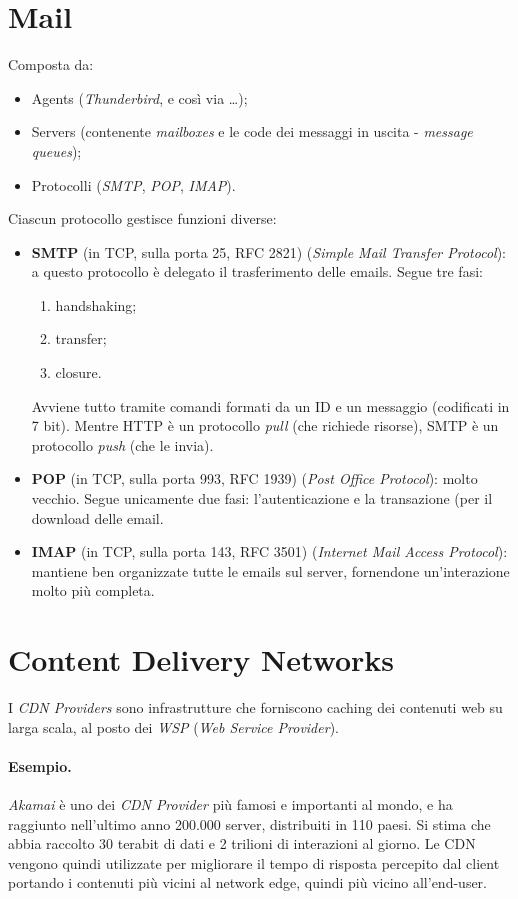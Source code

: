 \newpage

\section{Mail}
Composta da:
\begin{itemize}
    \item Agents (\textit{Thunderbird}, e così via \ldots);
    \item Servers (contenente \textit{mailboxes} e le code dei messaggi in uscita - \textit{message queues});
    \item Protocolli (\textit{SMTP}, \textit{POP}, \textit{IMAP}).
\end{itemize}
Ciascun protocollo gestisce funzioni diverse:
\begin{itemize}
    \item \textbf{SMTP} (in TCP, sulla porta 25, RFC 2821) (\textit{Simple Mail Transfer Protocol}): a questo protocollo è delegato il trasferimento delle emails. Segue tre fasi:
    \begin{enumerate}
        \item handshaking;
        \item transfer;
        \item closure.
    \end{enumerate}
    Avviene tutto tramite comandi formati da un ID e un messaggio (codificati in 7 bit). Mentre HTTP è un protocollo \textit{pull} (che richiede risorse), SMTP è un protocollo \textit{push} (che le invia).
    \item \textbf{POP} (in TCP, sulla porta 993, RFC 1939) (\textit{Post Office Protocol}): molto vecchio. Segue unicamente due fasi: l'autenticazione e la transazione (per il download delle email.
    \item \textbf{IMAP} (in TCP, sulla porta 143, RFC 3501) (\textit{Internet Mail Access Protocol}): mantiene ben organizzate tutte le emails sul server, fornendone  un'interazione molto più completa.
\end{itemize}


\section{Content Delivery Networks}
I \textit{CDN Providers} sono infrastrutture che forniscono caching dei contenuti web su larga scala, al posto dei \textit{WSP} (\textit{Web Service Provider}).
\paragraph{Esempio.}
\textit{Akamai} è uno dei \textit{CDN Provider} più famosi e importanti al mondo, e ha raggiunto nell'ultimo anno 200.000 server, distribuiti in 110 paesi. Si stima che abbia raccolto 30 terabit di dati e 2 trilioni di interazioni al giorno.
Le CDN vengono quindi utilizzate per migliorare il tempo di risposta percepito dal client portando i contenuti più vicini al network edge, quindi più vicino all'end-user. \\
\newpage

